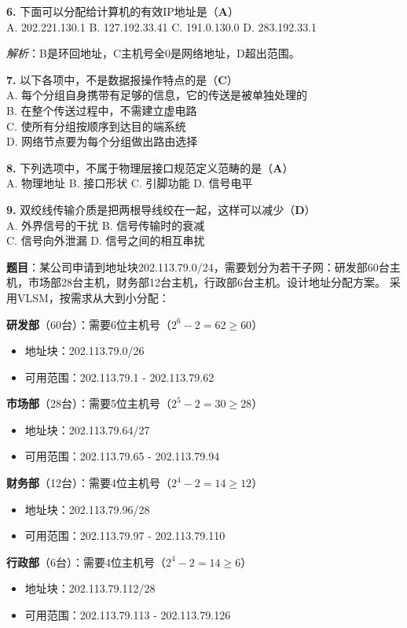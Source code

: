 \begin{examplebox}[选择题（补充）]
\textbf{6.} 下面可以分配给计算机的有效IP地址是（\textbf{A}）\\
A. 202.221.130.1 \quad B. 127.192.33.41 \quad C. 191.0.130.0 \quad D. 283.192.33.1

\textit{解析}：B是环回地址，C主机号全0是网络地址，D超出范围。

\textbf{7.} 以下各项中，不是数据报操作特点的是（\textbf{C}）\\
A. 每个分组自身携带有足够的信息，它的传送是被单独处理的\\
B. 在整个传送过程中，不需建立虚电路\\
C. 使所有分组按顺序到达目的端系统\\
D. 网络节点要为每个分组做出路由选择

\textbf{8.} 下列选项中，不属于物理层接口规范定义范畴的是（\textbf{A}）\\
A. 物理地址 \quad B. 接口形状 \quad C. 引脚功能 \quad D. 信号电平

\textbf{9.} 双绞线传输介质是把两根导线绞在一起，这样可以减少（\textbf{D}）\\
A. 外界信号的干扰 \quad B. 信号传输时的衰减\\
C. 信号向外泄漏 \quad D. 信号之间的相互串扰
\end{examplebox}

\begin{examplebox}
\textbf{题目}：某公司申请到地址块202.113.79.0/24，需要划分为若干子网：研发部60台主机，市场部28台主机，财务部12台主机，行政部6台主机。设计地址分配方案。
\tcblower
采用VLSM，按需求从大到小分配：

\textbf{研发部}（60台）：需要6位主机号（$2^6-2=62\geq60$）
\begin{itemize}[itemsep=0pt]
    \item 地址块：202.113.79.0/26
    \item 可用范围：202.113.79.1 - 202.113.79.62
\end{itemize}

\textbf{市场部}（28台）：需要5位主机号（$2^5-2=30\geq28$）
\begin{itemize}[itemsep=0pt]
    \item 地址块：202.113.79.64/27
    \item 可用范围：202.113.79.65 - 202.113.79.94
\end{itemize}

\textbf{财务部}（12台）：需要4位主机号（$2^4-2=14\geq12$）
\begin{itemize}[itemsep=0pt]
    \item 地址块：202.113.79.96/28
    \item 可用范围：202.113.79.97 - 202.113.79.110
\end{itemize}

\textbf{行政部}（6台）：需要4位主机号（$2^4-2=14\geq6$）
\begin{itemize}[itemsep=0pt]
    \item 地址块：202.113.79.112/28
    \item 可用范围：202.113.79.113 - 202.113.79.126
\end{itemize}
\end{examplebox}

